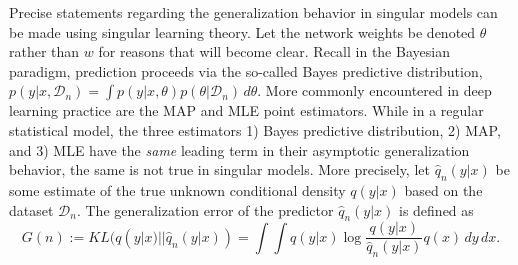 \documentclass{article} %
\begin{document}
Precise statements regarding the generalization behavior in singular models can be made using singular learning theory.
Let the network weights be denoted $\theta$ rather than $w$ for reasons that will become clear. Recall in the Bayesian paradigm, prediction proceeds via the so-called Bayes predictive distribution,
$
p(y|x, \mathcal D_n) = \int p(y|x,\theta) p(\theta|\mathcal D_n) \,d\theta.
$
More commonly encountered in deep learning practice are the MAP and MLE point estimators.
While in a regular statistical model, the three estimators 1) Bayes predictive distribution, 2) MAP, and 3) MLE have the \textit{same} leading term in their asymptotic generalization behavior, the same is not true in singular models.
More precisely, let $\hat q_n(y|x)$ be some estimate of the true unknown conditional density $q(y|x)$ based on the dataset $\mathcal D_n$. The generalization error of the predictor $\hat q_n(y|x)$ is defined as
\begin{equation}
G(n) := KL (q(y|x) || \hat q_n(y|x) ) = \int  \int q(y|x) \log \frac{q(y|x)}{\hat q_n(y|x)} q(x) \,dy  \,dx.
\label{eq:Gn}
\end{equation}
\end{document}
